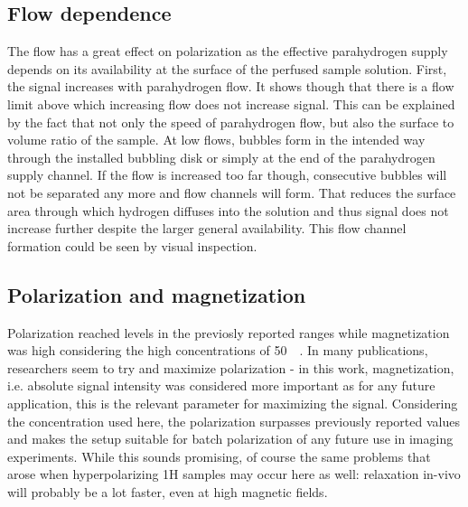        \subsection{Flow dependence}
            The flow has a great effect on polarization as the effective parahydrogen supply depends on its availability at the surface of the perfused sample solution. First, the signal increases with parahydrogen flow. It shows though that there is a flow limit above which increasing flow does not increase signal. This can be explained by the fact that not only the speed of parahydrogen flow, but also the surface to volume ratio of the sample. At low flows, bubbles form in the intended way through the installed bubbling disk or simply at the end of the parahydrogen supply channel. If the flow is increased too far though, consecutive bubbles will not be separated any more and flow channels will form. That reduces the surface area through which hydrogen diffuses into the solution and thus signal does not increase further despite the larger general availability. This flow channel formation could be seen by visual inspection.
        \subsection{Polarization and magnetization}
            Polarization reached levels in the previosly reported ranges while magnetization was high considering the high concentrations of \SI{50}{\milli\molar}. In many publications, researchers seem to try and maximize polarization - in this work, magnetization, i.e. absolute signal intensity was considered more important as for any future application, this is the relevant parameter for maximizing the signal. Considering the concentration used here, the polarization surpasses previously reported values and makes the setup suitable for batch polarization of any future use in imaging experiments. While this sounds promising, of course the same problems that arose when hyperpolarizing 1H samples may occur here as well: relaxation in-vivo will probably be a lot faster, even at high magnetic fields.
